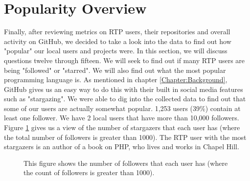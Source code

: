 \section{Popularity Overview}
\label{sec-PopularityOverview}
Finally, after reviewing metrics on RTP users, their repositories and overall activity on GitHub, we decided to take a look into the data to find out how "popular" our local users and projects were. In this section, we will discuss questions twelve through fifteen. We will seek to find out if many RTP users are being "followed" or "starred". We will also find out what the most popular programming language is. As mentioned in chapter \ref{Chapter:Background}, GitHub gives us an easy way to do this with their built in social media features such as "stargazing". We were able to dig into the collected data to find out that some of our users are actually somewhat popular. 1,253 users (39\%) contain at least one follower. We have 2 local users that have more than 10,000 followers. Figure \ref{fig-stargazersByUser} gives us a view of the number of stargazers that each user has (where the total number of followers is greater than 1000). The RTP user with the most stargazers is an author of a book on PHP, who lives and works in Chapel Hill.

\begin{figure}
\begin{bchart}[max=125.71,width=.9\textwidth]
 \end{bchart}
\caption{This figure shows the number of followers that each user has (where the count of followers is greater than 1000).}
\label{fig-stargazersByUser}
\end{figure}

